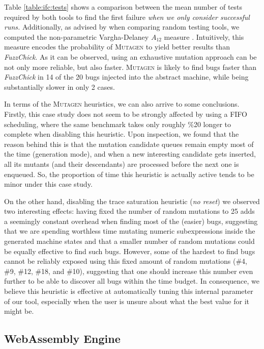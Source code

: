 \documentclass[sigconf, anonymous]{acmart}
\newcommand{\fuzzchick}{\textit{FuzzChick}\xspace}
\newcommand{\mutagen}{\textsc{Mutagen}\xspace}
\begin{document}
Table \ref{table:ifc:tests} shows a comparison between the mean number of tests
required by both tools to find the first failure \emph{when we only consider
  successful runs.}
%
Additionally, as advised by \cite{arcuri2014hitchhiker} when comparing random
testing tools, we computed the non-parametric Vargha-Delaney $A_{12}$ measure
\cite{vargha2000critique}.
%
Intuitively, this measure encodes the probability of \mutagen to yield better
results than \fuzzchick.
%
As it can be observed, using an exhaustive mutation approach can be not only
more reliable, but also faster.
%
\mutagen is likely to find bugs faster than \fuzzchick in 14 of the 20 bugs
injected into the abstract machine, while being substantially slower in only 2
cases.


In terms of the \mutagen heuristics, we can also arrive to some conclusions.
%
Firstly, this case study does not seem to be strongly affected by using a FIFO
scheduling, where the same benchmark takes only roughly \%20 longer to complete
when disabling this heuristic.
%
Upon inspection, we found that the reason behind this is that the mutation
candidate queues remain empty most of the time (generation mode), and when a new
interesting candidate gets inserted, all its mutants (and their descendants) are
processed before the next one is enqueued.
%
So, the proportion of time this heuristic is actually active tends to be minor
under this case study.


On the other hand, disabling the trace saturation heuristic (\textit{no reset})
we observed two interesting effects:
%
having fixed the number of random mutations to 25 adds a seemingly constant
overhead when finding most of the (easier) bugs, suggesting that we are spending
worthless time mutating numeric subexpressions inside the generated machine
states and that a smaller number of random mutations could be equally effective
to find such bugs.
%
However, some of the hardest to find bugs cannot be reliably exposed using this
fixed amount of random mutations (\#4, \#9, \#12, \#18, and \#10), suggesting
that one should increase this number even further to be able to discover all
bugs within the time budget.
%
In consequence, we believe this heuristic is effective at automatically tuning
this internal parameter of our tool, especially when the user is unsure about
what the best value for it might be.


\subsection{WebAssembly Engine}
\end{document}
